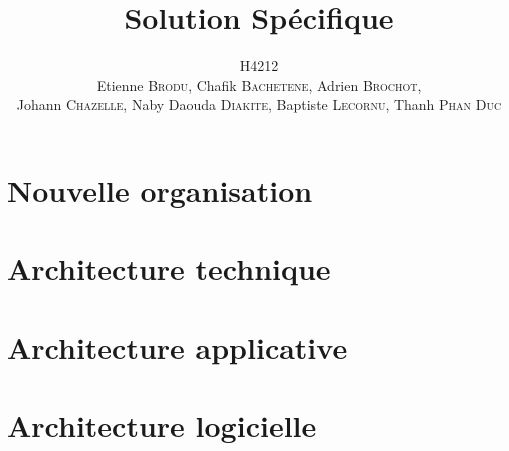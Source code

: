 \documentclass[a4paper,11pt]{article}
\title{Solution Spécifique}
\author{H4212\\Etienne \textsc{Brodu}, Chafik \textsc{Bachetene}, Adrien \textsc{Brochot},\\Johann \textsc{Chazelle}, Naby Daouda \textsc{Diakite}, Baptiste \textsc{Lecornu}, Thanh \textsc{Phan Duc}}
\begin{document}
\maketitle
\newpage

\tableofcontents
\newpage

\part{Nouvelle organisation}
    
    
\part{Architecture technique}
	

\part{Architecture applicative}
    

\part{Architecture logicielle}
    
\end{document}
